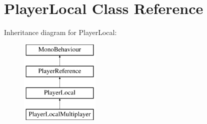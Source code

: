 \hypertarget{class_player_local}{\section{Player\-Local Class Reference}
\label{class_player_local}
}
Inheritance diagram for Player\-Local\-:\begin{figure}[H]
\begin{center}
\leavevmode
\includegraphics[height=4.000000cm]{class_player_local}
\end{center}
\end{figure}
